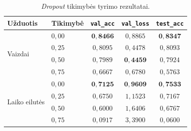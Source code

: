 \begin{table}[H]
    \centering
    \caption{\textit{Dropout} tikimybės tyrimo rezultatai.}
    \begin{tabular}{|l|l|c|c|c|}
        \hline
        Užduotis & Tikimybė & \texttt{val\_acc} & \texttt{val\_loss} & \texttt{test\_acc} \\
        \hline
        \multirow{4}{*}{Vaizdai}
            & \textbf{$0{,}00$} & $\mathbf{0{,}8466}$ & $0{,}8865$ & $\mathbf{0{,}8347}$ \\ \cline{2-5}
            & $0{,}25$ & $0{,}8095$ & $0{,}4478$ & $0{,}8093$ \\ \cline{2-5}
            & $0{,}50$ & $0{,}7989$ & $\mathbf{0{,}4459}$ & $0{,}7924$ \\ \cline{2-5}
            & $0{,}75$ & $0{,}6667$ & $0{,}6780$ & $0{,}5763$ \\
        \hline
        \multirow{4}{*}{Laiko eilutės}
            & \textbf{$0{,}00$} & $\mathbf{0{,}7125}$ & $\mathbf{0{,}9609}$ & $\mathbf{0{,}7533}$ \\ \cline{2-5}
            & $0{,}25$ & $0{,}6750$ & $1{,}1523$ & $0{,}7167$ \\ \cline{2-5}
            & $0{,}50$ & $0{,}6000$ & $1{,}6406$ & $0{,}6767$ \\ \cline{2-5}
            & $0{,}75$ & $0{,}0917$ & $3{,}3900$ & $0{,}0600$ \\
        \hline
    \end{tabular}
    \label{tab:rez_dropout}
\end{table}
